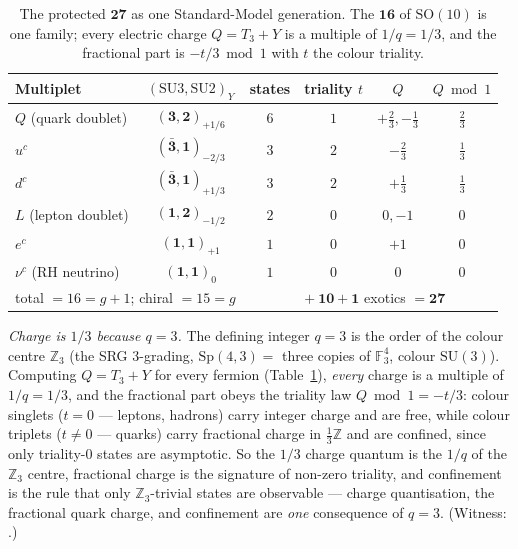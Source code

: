 \documentclass[11pt]{article}
\begin{document}
\begin{table}[ht]\centering\small
\caption{The protected $\mathbf{27}$ as one Standard-Model generation. The $\mathbf{16}$ of
$\mathrm{SO}(10)$ is one family; every electric charge $Q=T_3+Y$ is a multiple of $1/q=1/3$, and the
fractional part is $-t/3 \bmod 1$ with $t$ the colour triality.}
\label{tab:27-sm}
\begin{tabular}{l c c c c c}
\toprule
Multiplet & $(\mathrm{SU}3,\mathrm{SU}2)_Y$ & states & triality $t$ & $Q$ & $Q\bmod1$\\ \midrule
$Q$ (quark doublet) & $(\mathbf{3},\mathbf{2})_{+1/6}$ & $6$ & $1$ & $+\tfrac23,-\tfrac13$ & $\tfrac23$\\
$u^c$ & $(\bar{\mathbf3},\mathbf1)_{-2/3}$ & $3$ & $2$ & $-\tfrac23$ & $\tfrac13$\\
$d^c$ & $(\bar{\mathbf3},\mathbf1)_{+1/3}$ & $3$ & $2$ & $+\tfrac13$ & $\tfrac13$\\
$L$ (lepton doublet) & $(\mathbf1,\mathbf2)_{-1/2}$ & $2$ & $0$ & $0,-1$ & $0$\\
$e^c$ & $(\mathbf1,\mathbf1)_{+1}$ & $1$ & $0$ & $+1$ & $0$\\
$\nu^c$ (RH neutrino) & $(\mathbf1,\mathbf1)_{0}$ & $1$ & $0$ & $0$ & $0$\\ \midrule
\multicolumn{2}{l}{total $=16=g+1$; chiral $=15=g$} & & \multicolumn{3}{l}{$+\ \mathbf{10}+\mathbf1$ exotics $=\mathbf{27}$}\\
\bottomrule
\end{tabular}
\end{table}

\emph{Charge is $1/3$ because $q=3$.} The defining integer $q=3$ is the order of the colour centre
$\mathbb{Z}_3$ (the SRG $3$-grading, $\mathrm{Sp}(4,3)=$ three copies of $\mathbb{F}_3^4$, colour
$\mathrm{SU}(3)$). Computing $Q=T_3+Y$ for every fermion (Table~\ref{tab:27-sm}), \emph{every} charge
is a multiple of $1/q=1/3$, and the fractional part obeys the triality law $Q\bmod1=-t/3$: colour
singlets ($t=0$ --- leptons, hadrons) carry integer charge and are free, while colour triplets
($t\neq0$ --- quarks) carry fractional charge in $\tfrac13\mathbb{Z}$ and are confined, since only
triality-$0$ states are asymptotic. So the $1/3$ charge quantum is the $1/q$ of the $\mathbb{Z}_3$
centre, fractional charge is the signature of non-zero triality, and confinement is the rule that
only $\mathbb{Z}_3$-trivial states are observable --- charge quantisation, the fractional quark
charge, and confinement are \emph{one} consequence of $q=3$. (Witness:
.)
\end{document}
